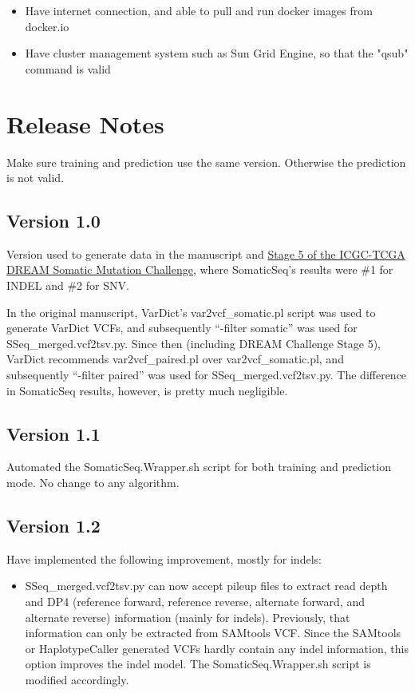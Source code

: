 \documentclass[10pt,letterpaper]{article}
\begin{document}
\begin{sloppypar}
\begin{itemize}
  \item Have internet connection, and able to pull and run docker images from docker.io

  \item Have cluster management system such as Sun Grid Engine, so that the "qsub" command is valid

\end{itemize}





\section{Release Notes}

Make sure training and prediction use the same version. Otherwise the prediction is not valid. 


\subsection{Version 1.0}
Version used to generate data in the manuscript and \href{https://www.synapse.org/#!Synapse:syn312572/wiki/72943}{Stage 5 of the ICGC-TCGA DREAM Somatic Mutation Challenge}, where SomaticSeq's results were \#1 for INDEL and \#2 for SNV. 

In the original manuscript, VarDict's var2vcf\_somatic.pl script was used to generate VarDict VCFs, and subsequently ``-filter somatic'' was used for SSeq\_merged.vcf2tsv.py. Since then (including DREAM Challenge Stage 5), VarDict recommends var2vcf\_paired.pl over var2vcf\_somatic.pl, and subsequently ``-filter paired'' was used for SSeq\_merged.vcf2tsv.py. The difference in SomaticSeq results, however, is pretty much negligible. 

\subsection{Version 1.1}
Automated the SomaticSeq.Wrapper.sh script for both training and prediction mode. No change to any algorithm. 

\subsection{Version 1.2}
Have implemented the following improvement, mostly for indels:

\begin{itemize}
 
  \item 
  SSeq\_merged.vcf2tsv.py can now accept pileup files to extract read depth and DP4 (reference forward, reference reverse, alternate forward, and alternate reverse) information (mainly for indels). Previously, that information can only be extracted from SAMtools VCF. Since the SAMtools or HaplotypeCaller generated VCFs hardly contain any indel information, this option improves the indel model. The SomaticSeq.Wrapper.sh script is modified accordingly.
 

\end{itemize}
\end{sloppypar}
\end{document}
